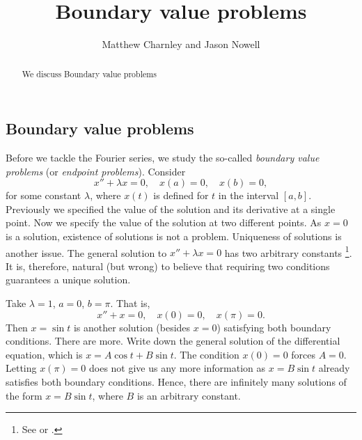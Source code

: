 \documentclass{ximera}
\title{Boundary value problems}
\author{Matthew Charnley and Jason Nowell}
\begin{document}
\begin{abstract}
    We discuss Boundary value problems
\end{abstract}
\maketitle

\label{bvp:section}




\subsection{Boundary value problems}

Before we tackle the Fourier series, we study the so-called \emph{boundary value problems} (or \emph{endpoint problems}).  Consider
\begin{equation*}
    x'' + \lambda x = 0, \quad x(a) = 0, \quad x(b) = 0,
\end{equation*}
for some constant $\lambda$, where $x(t)$ is defined for $t$ in the interval $[a,b]$. Previously we specified the value of the solution and its derivative at a single point.  Now we specify the value of the solution at two different points.  As $x=0$ is a solution, existence of solutions is not a problem.  Uniqueness of solutions is another issue. The general solution to $x'' + \lambda x = 0$ has two arbitrary constants%
\footnote{
    See  or %
    .
    }. 
It is, therefore, natural (but wrong) to believe that requiring two conditions guarantees a unique solution.

\begin{example}
    Take $\lambda = 1$, $a=0$, $b=\pi$.  That is,
    \begin{equation*}
        x'' + x = 0, \quad x(0) = 0, \quad x(\pi) = 0.
    \end{equation*}
    Then $x = \sin t$ is another solution (besides $x=0$) satisfying both boundary conditions.  There are more.  Write down the general solution of the differential equation, which is $x= A \cos t + B \sin t$. The condition $x(0) = 0$ forces $A=0$.  Letting $x(\pi) = 0$ does not give us any more information as $x = B \sin t$ already satisfies both boundary conditions. Hence, there are infinitely many solutions of the form $x = B \sin t$, where $B$ is an arbitrary constant.
\end{example}
\end{document}
